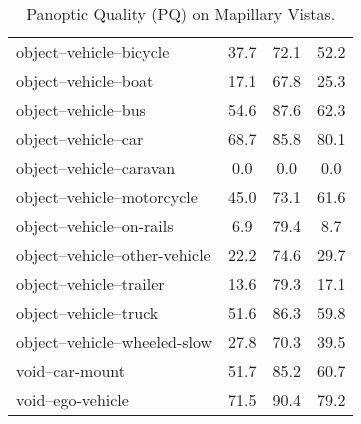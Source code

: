 \documentclass[10pt,twocolumn]{article}
\begin{document}
\begin{table*}[ht!]
{\begin{tabular}{@{}lccc@{}}
object--vehicle--bicycle & 37.7 & 72.1 & 52.2 \\
object--vehicle--boat & 17.1 & 67.8 & 25.3 \\
object--vehicle--bus & 54.6 & 87.6 & 62.3 \\
object--vehicle--car & 68.7 & 85.8 & 80.1 \\
object--vehicle--caravan & 0.0 & 0.0 & 0.0 \\
object--vehicle--motorcycle & 45.0 & 73.1 & 61.6 \\
object--vehicle--on-rails & 6.9 & 79.4 & 8.7 \\
object--vehicle--other-vehicle & 22.2 & 74.6 & 29.7 \\
object--vehicle--trailer & 13.6 & 79.3 & 17.1 \\
object--vehicle--truck & 51.6 & 86.3 & 59.8 \\
object--vehicle--wheeled-slow & 27.8 & 70.3 & 39.5 \\
void--car-mount & 51.7 & 85.2 & 60.7 \\
void--ego-vehicle & 71.5 & 90.4 & 79.2 \\ \bottomrule
\end{tabular}
}

\caption{Panoptic Quality (PQ) on Mapillary Vistas.\label{tab:vistas}}
\end{table*}
\end{document}

